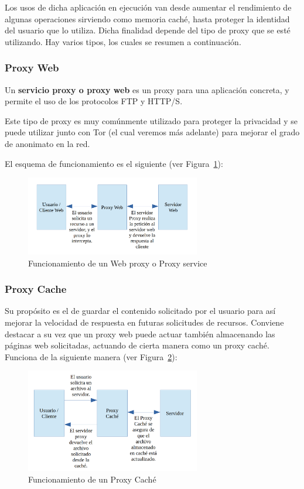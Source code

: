 Los usos de dicha aplicación en ejecución van desde aumentar el rendimiento de algunas operaciones sirviendo como memoria caché, hasta proteger la identidad del usuario que lo utiliza.
Dicha finalidad depende del tipo de proxy que se esté utilizando.
Hay varios tipos, los cuales se resumen a continuación.

\subsubsection{Proxy Web}

Un \textbf{servicio proxy o proxy web} es un proxy para una aplicación concreta, y permite el uso de los protocolos FTP y HTTP/S.

Este tipo de proxy es muy comúnmente utilizado para proteger la privacidad y se puede utilizar junto con Tor (el cual veremos más adelante) para mejorar el grado de anonimato en la red.

El esquema de funcionamiento es el siguiente (ver Figura~\ref{fig:web_proxy}):

\begin{figure}[H]
	\centerline{
		\mbox{\includegraphics[width=3.00in]{images/proxy_web.png}}
	}
	\caption{Funcionamiento de un Web proxy o Proxy service}
	\label{fig:web_proxy}
\end{figure}

\subsubsection{Proxy Cache}

Su propósito es el de guardar el contenido solicitado por el usuario para así mejorar la velocidad de respuesta en futuras solicitudes de recursos. 
Conviene destacar a su vez que un proxy web puede actuar también almacenando las páginas web solicitadas, actuando de cierta manera como un proxy caché. Funciona de la siguiente manera (ver Figura~\ref{fig:proxy_cache}):

\begin{figure}[H]
	\centerline{
		\mbox{\includegraphics[width=3.00in]{images/proxy_cache.png}}
	}
	\caption{Funcionamiento de un Proxy Caché}
	\label{fig:proxy_cache}
\end{figure}

